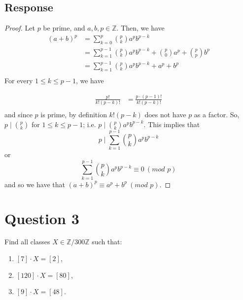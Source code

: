 \documentclass[13pt]{article}
\begin{document}
\subsection*{Response}
\begin{proof}
  Let $p$ be prime, and $a, b, p \in \mathbb{Z}$. Then, we have
  \begin{align*}
    (a + b)^p &= \sum_{k = 0}^{p} \binom{p}{k} a^p b^{p - k} \\
              &= \sum_{k = 1}^{p - 1} \binom{p}{k} a^p b^{p - k} + \binom{p}{0} a^p + \binom{p}{p} b^p \\
              &= \sum_{k = 1}^{p - 1} \binom{p}{k} a^p b^{p - k} + a^p + b^p \\
  \end{align*}
  For every $1 \leq k \leq p - 1$, we have

  \begin{align*}
    \frac{p!}{k!(p - k)!} &= \frac{p \cdot (p - 1)!}{k!(p - k)!} \\
  \end{align*}
  and since $p$ is prime, by definition $k!(p - k)$ does not have $p$ as a factor. So, $p \mid
  \binom{p}{k}$ for $1 \leq k \leq p - 1$; i.e. $p \mid \binom{p}{k} a^p b^{p - k}$. This implies
  that
  \[p \mid \sum_{k = 1}^{p - 1} \binom{p}{k} a^p b^{p - k}\]
  or
  \[\sum_{k = 1}^{p - 1} \binom{p}{k} a^p b^{p - k} \equiv 0 \ (\textit{mod } p)\]
  and so we have that $(a + b)^p \equiv a^p + b^p \ (\textit{mod } p)$.
\end{proof}





\newpage
\section*{Question 3}
Find all classes $X \in \mathbb{Z} / 300 \mathbb{Z}$ such that:
\begin{enumerate}[label=(\roman*)]
\item ${[7]} \cdot X = {[2]}$,
\item ${[120]} \cdot X = {[80]}$,
\item ${[9]} \cdot X = {[48]}$.
\end{enumerate}
\end{document}
